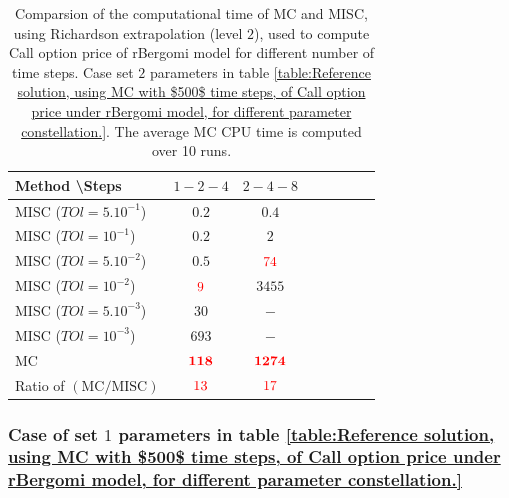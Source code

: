 \documentclass[11pt]{article}
\begin{document}
		\begin{table}[!h]
		\centering
		\begin{tabular}{l*{6}{c}r}
		Method \textbackslash  Steps            & $1-2-4$ & $2-4-8$   \\
		\hline
		MISC ($TOl=5.10^{-1}$)  & $0.2$ & $0.4$  \\
		MISC ($TOl=10^{-1}$)  & $0.2$ & $2$ &   \\
		MISC ($TOl=5.10^{-2}$)  & $0.5$ & ${\color{red}74}$  \\
		MISC ($TOl=10^{-2}$)  & ${\color{red}9}$ & $3455$   \\
		MISC ($TOl=5.10^{-3}$)  & $30$ & $-$  \\	
		MISC ($TOl=10^{-3}$)  & $693$ & $-$  \\	
		\hline
		MC    & $\mathbf{ {\color{red}  118}}$  & $\mathbf{ {\color{red}1274}}$  \\
		
		\hline
		Ratio of $\left(\text{MC}/ \text{MISC} \right)$  &${\color{red}13}$ & ${\color{red}  17}$   \\
		\hline
		\end{tabular}
		\caption{Comparsion of the computational time of  MC and MISC, using Richardson extrapolation (level $2$), used to compute Call option price of rBergomi model for different number of time steps. Case set $2$ parameters in table \ref{table:Reference solution, using MC with $500$ time steps, of Call option price under rBergomi model, for different parameter constellation.}. The
			average MC CPU time is computed over 10 runs.}
		\label{Comparsion of the computational time of  MC and MISC, using Richardson extrapolation (level $2$), used to compute Call option price of rBergomi model for different number of time steps. Case set $2$ parameters,linear}
		\end{table}




%


\FloatBarrier
\subsubsection{Case of set $1$ parameters in table \ref{table:Reference solution, using MC with $500$ time steps, of Call option price under rBergomi model, for different parameter constellation.}}\label{sec:Case of set 1 parameters}
\end{document}
